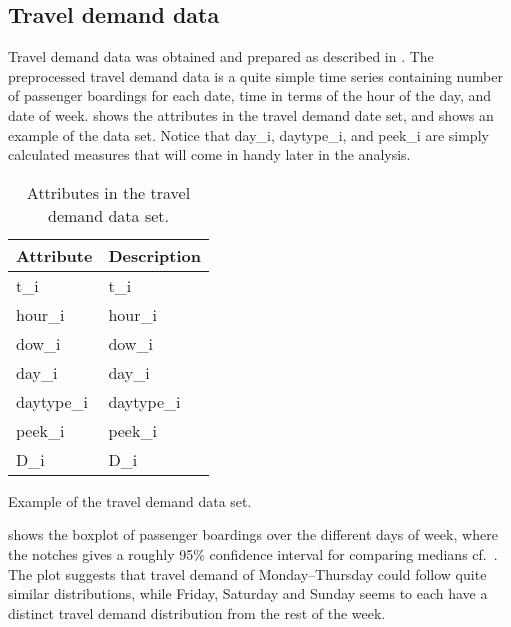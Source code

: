 
\subsection{Travel demand data}\label{ch:desc_traveldemand}

Travel demand data was obtained and prepared as described in . The preprocessed travel demand data is a quite simple time series containing number of passenger boardings for each date, time in terms of the hour of the day, and date of week.  shows the attributes in the travel demand date set, and  shows an example of the data set. Notice that \gls{day_i}, \gls{daytype_i}, and \gls{peek_i} are simply calculated measures that will come in handy later in the analysis.

\begin{table}[!ht]
    \center
    \begin{tabular}{p{.7in}p{4.5in}}        
        Attribute & Description \\
        \hline 
        \hline         
        \gls{t_i} & \glsdesc{t_i} \\
        \hline 
        \gls{hour_i} & \glsdesc{hour_i} \\
        \hline         
        \gls{dow_i} & \glsdesc{dow_i} \\
        \hline 
        \gls{day_i} & \glsdesc{day_i} \\
        \hline 
        \gls{daytype_i} & \glsdesc{daytype_i} \\
        \hline 
        \gls{peek_i} & \glsdesc{peek_i} \\
        \hline 
        \gls{D_i} & \glsdesc{D_i}  \\
    \end{tabular}
    \caption{Attributes in the travel demand data set.}
    \label{tab:travel_demand_data_attr}
\end{table}

\begin{table}[!ht]
    \center
    
    \caption{Example of the travel demand data set.}
    \label{tab:travel_demand_data_example}
\end{table}


 shows the boxplot of passenger boardings over the different days of week, where the notches gives a roughly 95\% confidence interval for comparing medians cf.~\citet{Boxplots}. The plot suggests that travel demand of Monday--Thursday could follow quite similar distributions, while Friday, Saturday and Sunday seems to each have a distinct travel demand distribution from the rest of the week.

